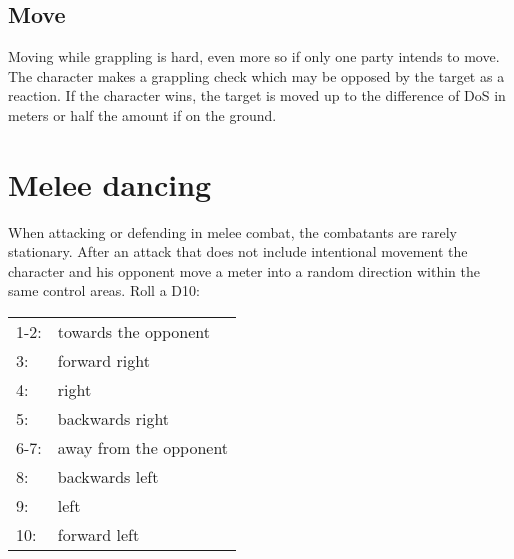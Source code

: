 \subsection*{Move}
Moving while grappling is hard, even more so if only one party intends to move.\\
The character makes a grappling check which may be opposed by the target as a reaction. If the character wins, the target is moved up to the difference of DoS in meters or half the amount if on the ground.

\pagebreak %
\section{Melee dancing}
When attacking or defending in melee combat, the combatants are rarely stationary. After an attack that does not include intentional movement the character and his opponent move a meter into a random direction within the same control areas. Roll a D10:
\par
\begin{tabular}{ll}
	1-2: & towards the opponent\\
	3:   & forward right\\
	4:   & right\\
	5:   & backwards right\\
	6-7: & away from the opponent\\
	8:   & backwards left\\
	9:   & left\\
	10:  & forward left
\end{tabular}
